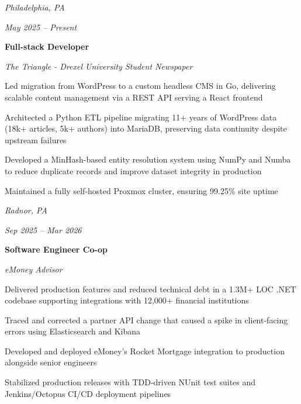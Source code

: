 \begin{twocolentry}{
        \textit{Philadelphia, PA}

        \textit{May 2025 – Present}}
    \textbf{Full-stack Developer}

    \textit{The Triangle - Drexel University Student Newspaper}
\end{twocolentry}

\vspace{0.09 cm}
\begin{onecolentry}
    \begin{highlights}
        \item Led migration from WordPress to a custom headless CMS in Go, delivering scalable content management via a REST API serving a React frontend
        \item Architected a Python ETL pipeline migrating 11+ years of WordPress data (18k+ articles, 5k+ authors) into MariaDB, preserving data continuity despite upstream failures
        \item Developed a MinHash-based entity resolution system using NumPy and Numba to reduce duplicate records and improve dataset integrity in production
        \item Maintained a fully self-hosted Proxmox cluster, ensuring 99.25\% site uptime
    \end{highlights}
\end{onecolentry}
\vspace{0.11 cm}

\begin{twocolentry}{
        \textit{Radnor, PA}

        \textit{Sep 2025 – Mar 2026}
    }
    \textbf{Software Engineer Co-op}

    \textit{eMoney Advisor}
\end{twocolentry}

\vspace{0.09 cm}

\begin{onecolentry}
    \begin{highlights}
        \item Delivered production features and reduced technical debt in a 1.3M+ LOC .NET codebase supporting integrations with 12,000+ financial institutions
        \item Traced and corrected a partner API change that caused a spike in client-facing errors using Elasticsearch and Kibana
        \item Developed and deployed eMoney's Rocket Mortgage integration to production alongside senior engineers
        \item Stabilized production releases with TDD-driven NUnit test suites and Jenkins/Octopus CI/CD deployment pipelines
    \end{highlights}
\end{onecolentry}


\vspace{0.11 cm}
